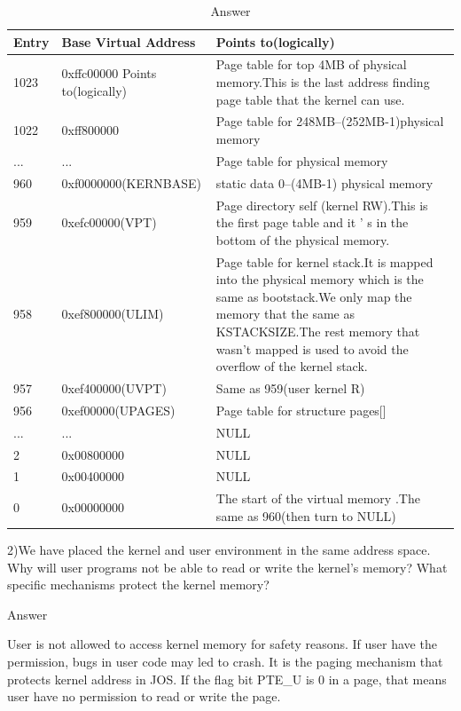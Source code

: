 \begin{table}[H]
\centering
\begin{tabular}{ |p{150pt}<{\centering}|p{150pt}<{\centering}|p{150pt}<{\centering}| }\toprule
\hline				
Entry & Base Virtual Address &Points to(logically) \\ \hline 	
1023 & 0xffc00000 Points to(logically) & Page table for top 4MB of physical memory.This is the last address finding page table that the kernel can use.\\ \hline
1022 & 0xff800000 &Page table for 248MB--(252MB-1)physical memory \\ \hline 	
... & ... &Page table for physical memory \\ \hline
960 & 0xf0000000(KERNBASE) &static data 0--(4MB-1) physical memory \\ \hline
959 & 0xefc00000(VPT) &Page directory self (kernel RW).This is the first page table and it ’ s in the bottom of the physical memory. \\ \hline
958 & 0xef800000(ULIM) &Page table for kernel stack.It is mapped into the physical memory which is the same as bootstack.We only map the memory that the same as KSTACKSIZE.The rest memory that wasn’t mapped is used to avoid the overflow of the kernel stack. \\ \hline
957 & 0xef400000(UVPT) &Same as 959(user kernel R) \\ \hline
956 & 0xef00000(UPAGES) &Page table for structure pages[] \\ \hline
... & ... & NULL \\ \hline
2 & 0x00800000 & NULL \\ \hline
1 & 0x00400000 & NULL \\ \hline
0 & 0x00000000 & The start of the virtual memory .The same as 960(then turn to NULL)\\ \hline
\end{tabular}
\caption{Answer}
\end{table}

\begin{flushleft}
2)We have placed the kernel and user environment in the same address space. Why will user programs not be able to read or write the kernel's memory? What specific mechanisms protect the kernel memory?

{\Large Answer}
\end{flushleft}

User is not allowed to access kernel memory for safety reasons.
If user have the permission, bugs in user code may led to crash.
It is the paging mechanism that protects kernel address in JOS. If the flag bit PTE\_U is 0 in a page, that means user have no permission to read or write the page.

